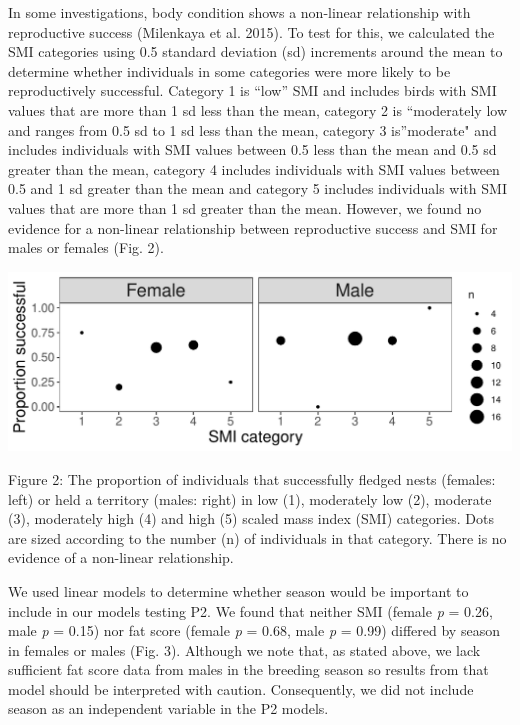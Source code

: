 \documentclass[
]{article}
\begin{document}
In some investigations, body condition shows a non-linear relationship
with reproductive success (Milenkaya et al. 2015). To test for this, we
calculated the SMI categories using 0.5 standard deviation (sd)
increments around the mean to determine whether individuals in some
categories were more likely to be reproductively successful. Category 1
is ``low'' SMI and includes birds with SMI values that are more than 1
sd less than the mean, category 2 is ``moderately low and ranges from
0.5 sd to 1 sd less than the mean, category 3 is''moderate" and includes
individuals with SMI values between 0.5 less than the mean and 0.5 sd
greater than the mean, category 4 includes individuals with SMI values
between 0.5 and 1 sd greater than the mean and category 5 includes
individuals with SMI values that are more than 1 sd greater than the
mean. However, we found no evidence for a non-linear relationship
between reproductive success and SMI for males or females (Fig. 2).

\includegraphics{gcondition_files/figure-latex/p2 non-linear trend results-1.pdf}

Figure 2: The proportion of individuals that successfully fledged nests
(females: left) or held a territory (males: right) in low (1),
moderately low (2), moderate (3), moderately high (4) and high (5)
scaled mass index (SMI) categories. Dots are sized according to the
number (n) of individuals in that category. There is no evidence of a
non-linear relationship.

We used linear models to determine whether season would be important to
include in our models testing P2. We found that neither SMI (female
\emph{p} = 0.26, male \emph{p} = 0.15) nor fat score (female \emph{p} =
0.68, male \emph{p} = 0.99) differed by season in females or males (Fig.
3). Although we note that, as stated above, we lack sufficient fat score
data from males in the breeding season so results from that model should
be interpreted with caution. Consequently, we did not include season as
an independent variable in the P2 models.
\end{document}
